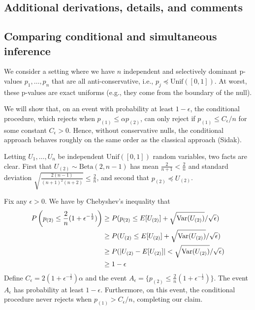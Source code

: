 \documentclass{article}
\newcommand{\Var}{\textup{Var}}
\begin{document}
\begin{appendix}

\section{Additional derivations, details, and comments}

\subsection{Comparing conditional and simultaneous inference}
\label{sec:beta_dist_appdx}

We consider a setting where we have $n$ independent and selectively dominant p-values $p_1, \dots, p_n$ that are all anti-conservative, i.e.,  $p_j \preceq \text{Unif}([0, 1])$. At worst, these p-values are exact uniforms (e.g., they come from the boundary of the null). 

We will show that, on an event with probability at least $1-\epsilon$, the conditional procedure, which rejects when $p_{(1)} \leq \alpha p_{(2)}$, can only reject if $p_{(1)} \leq C_{\epsilon}/n$ for some constant $C_{\epsilon} > 0$. Hence, without conservative nulls, the conditional approach behaves roughly on the same order as the classical approach (Sidak).   

Letting $U_1, \dots, U_n$ be independent $\text{Unif}([0, 1])$ random variables, two facts are clear. First that $U_{(2)} \sim \text{Beta}(2, n-1)$ has mean $\frac{2}{n + 1} < \frac{2}{n}$ and standard deviation $\sqrt{\frac{2(n-1)}{(n+1)^2(n+2)}} \leq \frac{2}{n}$, and second that $p_{(2)} \preceq U_{(2)}$. 

Fix any $\epsilon > 0$. We have by Chebyshev's inequality that  
\begin{align*}
    P\left(p_{(2)} \leq \frac{2}{n}(1 + \epsilon^{-\frac{1}{2}})\right) &\geq P(p_{(2)} \leq E[U_{(2)}] + \sqrt{\Var(U_{(2)})}/\sqrt{\epsilon})\\
    &\geq P(U_{(2)} \leq E[U_{(2)}] + \sqrt{\Var(U_{(2)})}/\sqrt{\epsilon})\\
    &\geq P(|U_{(2)} - E[U_{(2)}]| < \sqrt{\Var(U_{(2)})}/\sqrt{\epsilon} ) \\
    &\geq 1 - \epsilon
\end{align*}
Define $C_{\epsilon} = 2(1 + \epsilon^{-\frac{1}{2}})\alpha$ and the event $A_{\epsilon} = \{ p_{(2)} \leq \frac{2}{n}(1 + \epsilon^{-\frac{1}{2}})\}$. The event $A_{\epsilon}$ has probability at least $1-\epsilon$. Furthermore, on this event, the conditional procedure never rejects when $p_{(1)} > C_{\epsilon}/n$, completing our claim. 


\end{appendix}
\end{document}
